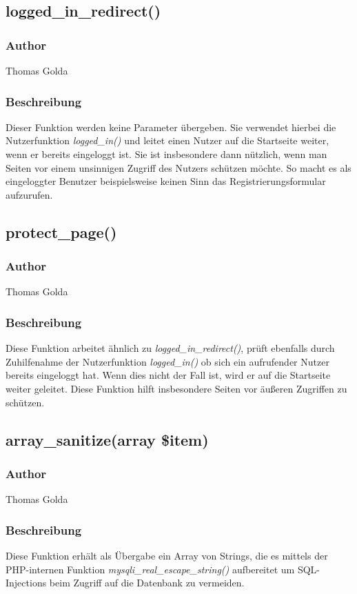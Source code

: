 \documentclass[fontsize = 12pt, paper = a4]{scrreprt}
\begin{document}
\subsection*{logged\_in\_redirect()}
\subsubsection*{Author}
Thomas Golda
\subsubsection*{Beschreibung}
Dieser Funktion werden keine Parameter übergeben. Sie verwendet hierbei die Nutzerfunktion \textit{logged\_in()} und leitet einen Nutzer auf die Startseite weiter, wenn er bereits eingeloggt ist. Sie ist insbesondere dann nützlich, wenn man Seiten vor einem unsinnigen Zugriff des Nutzers schützen möchte. So macht es als eingeloggter Benutzer beispielsweise keinen Sinn das Registrierungsformular aufzurufen.


\subsection*{protect\_page()}
\subsubsection*{Author}
Thomas Golda
\subsubsection*{Beschreibung}
Diese Funktion arbeitet ähnlich zu \textit{logged\_in\_redirect()}, prüft ebenfalls durch Zuhilfenahme der Nutzerfunktion \textit{logged\_in()} ob sich ein aufrufender Nutzer bereits eingeloggt hat. Wenn dies nicht der Fall ist, wird er auf die Startseite weiter geleitet. Diese Funktion hilft insbesondere Seiten vor äußeren Zugriffen zu schützen.


\subsection*{array\_sanitize(array \$item)}
\subsubsection*{Author}
Thomas Golda
\subsubsection*{Beschreibung}
Diese Funktion erhält als Übergabe ein Array von Strings, die es mittels der PHP-internen Funktion \textit{mysqli\_real\_escape\_string()} aufbereitet um SQL-Injections beim Zugriff auf die Datenbank zu vermeiden.
\end{document}
